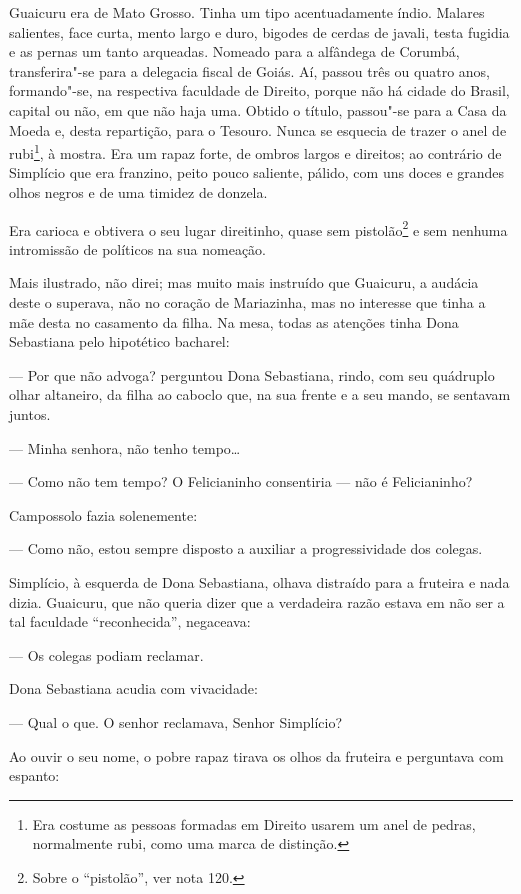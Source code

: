 Guaicuru era de Mato Grosso. Tinha um tipo acentuadamente índio. Malares
salientes, face curta, mento largo e duro, bigodes de cerdas de javali,
testa fugidia e as pernas um tanto arqueadas. Nomeado para a alfândega
de Corumbá, transferira"-se para a delegacia fiscal de Goiás. Aí, passou
três ou quatro anos, formando"-se, na respectiva faculdade de Direito,
porque não há cidade do Brasil, capital ou não, em que não haja uma.
Obtido o título, passou"-se para a Casa da Moeda e, desta repartição,
para o Tesouro. Nunca se esquecia de trazer o anel de rubi\footnote{Era
  costume as pessoas formadas em Direito usarem um anel de pedras,
  normalmente rubi, como uma marca de distinção.}, à mostra. Era um
rapaz forte, de ombros largos e direitos; ao contrário de Simplício que
era franzino, peito pouco saliente, pálido, com uns doces e grandes
olhos negros e de uma timidez de donzela.

Era carioca e obtivera o seu lugar direitinho, quase sem
pistolão\footnote{Sobre o ``pistolão'', ver nota 120.} e sem nenhuma
intromissão de políticos na sua nomeação.

Mais ilustrado, não direi; mas muito mais instruído que Guaicuru, a
audácia deste o superava, não no coração de Mariazinha, mas no interesse
que tinha a mãe desta no casamento da filha. Na mesa, todas as atenções
tinha Dona Sebastiana pelo hipotético bacharel:

--- Por que não advoga? perguntou Dona Sebastiana, rindo, com seu
quádruplo olhar altaneiro, da filha ao caboclo que, na sua frente e a
seu mando, se sentavam juntos.

--- Minha senhora, não tenho tempo\ldots{}

--- Como não tem tempo? O Felicianinho consentiria --- não é Felicianinho?

Campossolo fazia solenemente:

--- Como não, estou sempre disposto a auxiliar a progressividade dos
colegas.

Simplício, à esquerda de Dona Sebastiana, olhava distraído para a
fruteira e nada dizia. Guaicuru, que não queria dizer que a verdadeira
razão estava em não ser a tal faculdade ``reconhecida'', negaceava:

--- Os colegas podiam reclamar.

Dona Sebastiana acudia com vivacidade:

--- Qual o que. O senhor reclamava, Senhor Simplício?

Ao ouvir o seu nome, o pobre rapaz tirava os olhos da fruteira e
perguntava com espanto:

